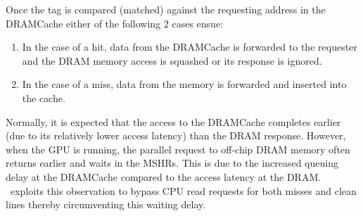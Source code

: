 Once the tag is compared (matched) against the requesting address in the DRAMCache either of the following 2 cases ensue: 
\begin{enumerate}[label=(\alph*)]
	\item In the case of a hit, data from the DRAMCache is forwarded to the requester and the DRAM memory access is squashed or its response is ignored. 
	\item In the case of a miss, data from the memory is forwarded and inserted into the cache.
\end{enumerate}
Normally, it is expected that the access to the DRAMCache completes earlier (due to its relatively lower access latency) than the DRAM response. However, when the GPU is running, the parallel request to off-chip DRAM memory often returns earlier and waits in the MSHRs. This is due to the increased queuing delay at the DRAMCache compared to the access latency at the DRAM. \cachename\ exploits this observation to bypass CPU read requests for both misses and clean lines thereby circumventing this waiting delay.

